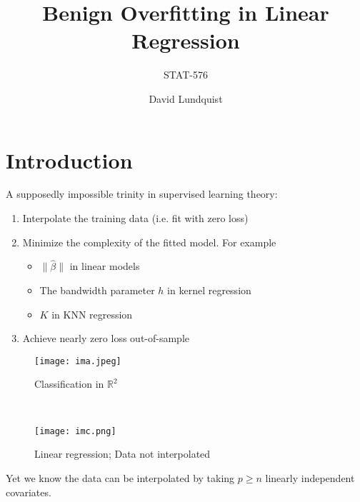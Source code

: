 \documentclass[pdf]{beamer}
\title{Benign Overfitting in Linear Regression}
\subtitle{STAT-576}
\author{David Lundquist}
\begin{document}
\begin{frame}
\titlepage
\end{frame}

\section{Introduction}

\begin{frame}
A supposedly impossible trinity in supervised learning theory:\\

\begin{enumerate}
    \item Interpolate the training data (i.e. fit with zero loss)
    \item Minimize the complexity of the fitted model.  For example
        \begin{itemize}
        \item $\|\hat\beta\|$ in linear models
        \item The bandwidth parameter $h$ in kernel regression
        \item $K$ in KNN regression
        \end{itemize}
    \item Achieve nearly zero loss out-of-sample 

\end{enumerate}

\end{frame}


\begin{frame}

\begin{figure}[h!]
  \texttt{[image: ima.jpeg]}
  \caption{Classification in $\mathbb{R}^{2}$}

\end{figure}

\\


\end{frame}

\begin{frame}

\begin{figure}[h!]
  \texttt{[image: imc.png]}
  \caption{Linear regression; Data not interpolated}

\end{figure}

Yet we know the data can be interpolated by taking $p \geq n$ linearly independent covariates.

\end{frame}
\end{document}
